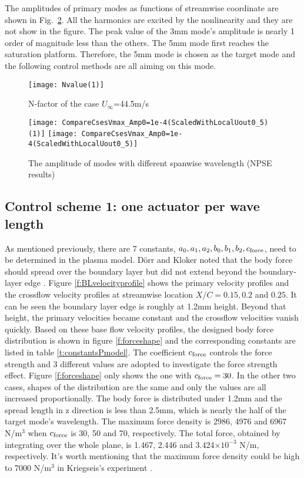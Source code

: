 \documentclass{AIAA}
\begin{document}
The amplitudes of primary modes as functions of streamwise coordinate are shown in Fig.~\ref{f:NPSE}. All the harmonics are excited by the nonlinearity and they are not show in the figure. The peak value of the 3mm mode's amplitude is nearly 1 order of magnitude less than the others. The 5mm mode first reaches the saturation platform. Therefore, the 5mm mode is chosen as the target mode and the following control methods are all aiming on this mode.
\begin{figure}
\centering
  \texttt{[image: Nvalue(1)]}
  \caption{N-factor of the case $U_\infty$=44.5m/s}%
  \label{fig:Nfactor445}
\end{figure}
\begin{figure}
\centering
  \texttt{[image: CompareCsesVmax\_Amp0=1e-4(ScaledWithLocalUout0\_5)(1)]} \texttt{[image: CompareCsesVmax\_Amp0=1e-4(ScaledWithLocalUout0\_5)]}
  \caption{The amplitude of modes with different spanwise wavelength (NPSE results)}\label{f:NPSE}%
\end{figure}

\subsection{Control scheme 1: one actuator per wave length}\label{subs:control1}
As mentioned previously, there are 7 constants, $a_0,a_1,a_2,b_0,b_1,b_2,c_{\rm force}$, need to be determined in the plasma model. D\"orr and Kloker noted that the body force should spread over the boundary layer but did not extend beyond the boundary-layer edge \cite{dorr2015stabilisation}. Figure \ref{f:BLvelocityprofile} shows the primary velocity profiles and the crossflow velocity profiles at streamwise location $X/C=0.15,0.2$ and $0.25$. It can be seen the boundary layer edge is roughly at 1.2mm height. Beyond that height, the primary velocities became constant and the crossflow velocities vanish quickly. Based on these base flow velocity profiles, the designed body force distribution is shown in figure \ref{f:forceshape} and the corresponding constants are listed in table \ref{t:constantsPmodel}. The coefficient $c_{\rm force}$ controls the force strength and 3 different values are adopted to investigate the force strength effect. Figure \ref{f:forceshape} only shows the one with $c_{\rm force}=30$. In the other two cases, shapes of the distribution are the same and only the values are all increased proportionally. The body force is distributed under 1.2mm and the spread length in z direction is less than 2.5mm, which is nearly the half of the target mode's wavelength. The maximum force density is 2986, 4976 and 6967 N/m$^3$ when $c_{\rm force}$ is 30, 50 and 70, respectively. The total force, obtained by integrating over the whole plane, is 1.467, 2.446 and 3.424$\times 10^{-3}$ N/m, respectively. It's worth mentioning that the maximum force density could be high to 7000 N/m$^3$ in Kriegseis's experiment \cite{Kriegseis2013velocity}.
\end{document}
